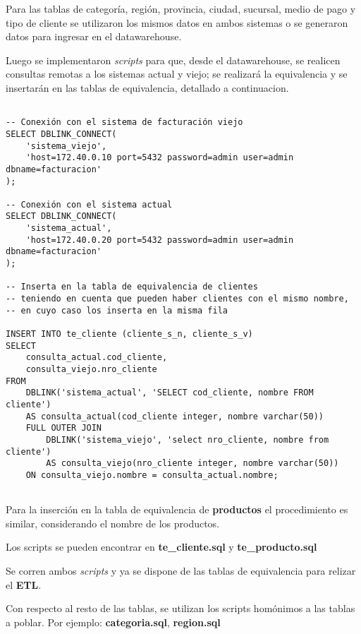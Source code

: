 Para las tablas de categoría, región, provincia, ciudad, sucursal, medio de pago y tipo de cliente se utilizaron los mismos datos en ambos sistemas o se generaron datos para ingresar en el datawarehouse.

Luego se implementaron \emph{scripts} para que, desde el datawarehouse, se realicen consultas remotas a los sistemas actual y viejo; se realizará la equivalencia y se insertarán en las tablas de equivalencia, detallado a continuacion. 

\pagebreak

\begin{lstlisting}[title=Inserción a la tabla de equivalencia de cliente]

-- Conexión con el sistema de facturación viejo
SELECT DBLINK_CONNECT(
	'sistema_viejo',
	'host=172.40.0.10 port=5432 password=admin user=admin dbname=facturacion'
);

-- Conexión con el sistema actual
SELECT DBLINK_CONNECT(
	'sistema_actual',
	'host=172.40.0.20 port=5432 password=admin user=admin dbname=facturacion'
);

-- Inserta en la tabla de equivalencia de clientes
-- teniendo en cuenta que pueden haber clientes con el mismo nombre,
-- en cuyo caso los inserta en la misma fila

INSERT INTO te_cliente (cliente_s_n, cliente_s_v)
SELECT
    consulta_actual.cod_cliente,
    consulta_viejo.nro_cliente
FROM
    DBLINK('sistema_actual', 'SELECT cod_cliente, nombre FROM cliente')
    AS consulta_actual(cod_cliente integer, nombre varchar(50))
    FULL OUTER JOIN
        DBLINK('sistema_viejo', 'select nro_cliente, nombre from cliente')
        AS consulta_viejo(nro_cliente integer, nombre varchar(50))
    ON consulta_viejo.nombre = consulta_actual.nombre;
    
\end{lstlisting}

Para la inserción en la tabla de equivalencia de \textbf{productos} el procedimiento es similar, considerando el nombre de los productos.

Los scripts se pueden encontrar en \textbf{te\_cliente.sql} y \textbf{te\_producto.sql}

Se corren ambos \emph{scripts} y ya se dispone de las tablas de equivalencia para relizar el \textbf{ETL}.

Con respecto al resto de las tablas, se utilizan los scripts homónimos a las tablas a poblar. Por ejemplo: \textbf{categoria.sql}, \textbf{region.sql}


